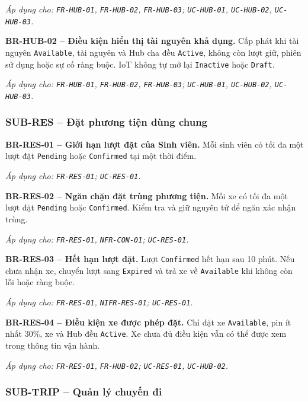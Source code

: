 \textit{Áp dụng cho: \texttt{FR-HUB-01}, \texttt{FR-HUB-02}, \texttt{FR-HUB-03};\newline
\texttt{UC-HUB-01}, \texttt{UC-HUB-02}, \texttt{UC-HUB-03}.}

\medskip
\noindent\textbf{BR-HUB-02 -- Điều kiện hiển thị tài nguyên khả dụng.} Cấp phát khi tài nguyên \texttt{Available}, tài nguyên và Hub cha đều \texttt{Active}, không còn lượt giữ, phiên sử dụng hoặc sự cố ràng buộc. IoT không tự mở lại \texttt{Inactive} hoặc \texttt{Draft}.

\textit{Áp dụng cho: \texttt{FR-HUB-01}, \texttt{FR-HUB-02}, \texttt{FR-HUB-03};\newline
\texttt{UC-HUB-01}, \texttt{UC-HUB-02}, \texttt{UC-HUB-03}.}

\subsubsection{SUB-RES -- Đặt phương tiện dùng chung}

\noindent\textbf{BR-RES-01 -- Giới hạn lượt đặt của Sinh viên.} Mỗi sinh viên có tối đa một lượt đặt \texttt{Pending} hoặc \texttt{Confirmed} tại một thời điểm.

\textit{Áp dụng cho: \texttt{FR-RES-01}; \texttt{UC-RES-01}.}

\medskip
\noindent\textbf{BR-RES-02 -- Ngăn chặn đặt trùng phương tiện.} Mỗi xe có tối đa một lượt đặt \texttt{Pending} hoặc \texttt{Confirmed}. Kiểm tra và giữ nguyên tử để ngăn xác nhận trùng.

\textit{Áp dụng cho: \texttt{FR-RES-01}, \texttt{NFR-CON-01}; \texttt{UC-RES-01}.}

\medskip
\noindent\textbf{BR-RES-03 -- Hết hạn lượt đặt.} Lượt \texttt{Confirmed} hết hạn sau 10 phút. Nếu chưa nhận xe, chuyển lượt sang \texttt{Expired} và trả xe về \texttt{Available} khi không còn lỗi hoặc ràng buộc.

\textit{Áp dụng cho: \texttt{FR-RES-01}, \texttt{NIFR-RES-01}; \texttt{UC-RES-01}.}

\medskip
\noindent\textbf{BR-RES-04 -- Điều kiện xe được phép đặt.} Chỉ đặt xe \texttt{Available}, pin ít nhất 30\%, xe và Hub đều \texttt{Active}. Xe chưa đủ điều kiện vẫn có thể được xem trong thông tin vận hành.

\textit{Áp dụng cho: \texttt{FR-RES-01}, \texttt{FR-HUB-02}; \texttt{UC-RES-01}, \texttt{UC-HUB-02}.}

\subsubsection{SUB-TRIP -- Quản lý chuyến đi}

